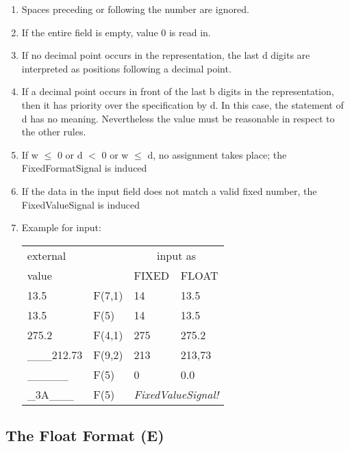 \begin{enumerate}
\begin{enumerate}
\item Spaces preceding or following the number are ignored.
\item If the entire field is empty, value 0 is read in.
\item If no decimal point occurs in the representation, the last d
digits are interpreted as positions following a decimal point.
\item If a decimal point occurs in front of the last b digits in the
representation, then it has priority over the specification by d. In
this case, the statement of d has no meaning. Nevertheless the value must
be reasonable in respect to the other rules. 
\item If w $\leq$ 0 or d $<$ 0 or w $\leq$ d, no assignment takes place;
    the FixedFormatSignal is induced
\item If the data in the input field does not match a valid fixed 
   number, the FixedValueSignal is induced


\item Example for input:

\begin{tabular}{llll}
external       &          & \multicolumn{2}{c}{input as}  \\ 
value       &          & FIXED & FLOAT  \\ \hline
13.5   & F(7,1)   &  14 & 13.5   \\
13.5   & F(5)     &  14 & 13.5   \\
275.2  & F(4,1)   & 275 & 275.2 \\
\_\_\_212.73 &  F(9,2)&  213 & 213,73 \\
\_\_\_\_\_ & F(5) & 0& 0.0 \\
\_3A\_\_\_ & F(5) & \multicolumn{2}{c}{\em FixedValueSignal!} \\
\end{tabular}
\end{enumerate}
\end{enumerate}


\subsection{The Float Format (E)}   %
\label{sec_dation_e_format}





